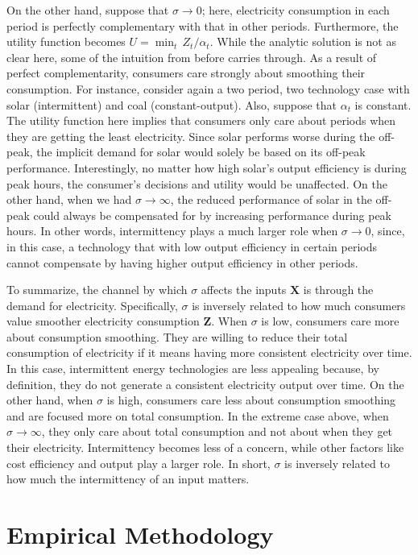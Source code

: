 \documentclass[11pt,a4paper,leqno]{extarticle}
\begin{document}
	On the other hand, suppose that $\sigma \to 0$; here, electricity consumption in each period is perfectly complementary with that in other periods. Furthermore, the utility function becomes $U = \min_t \, Z_t/\alpha_t$. While the analytic solution is not as clear here, some of the intuition from before carries through. As a result of perfect complementarity, consumers care strongly about smoothing their consumption. For instance, consider again a two period, two technology case with solar (intermittent) and coal (constant-output). Also, suppose that $\alpha_t$ is constant. The utility function here implies that consumers only care about periods when they are getting the least electricity. Since solar performs worse during the off-peak, the implicit demand for solar would solely be based on its off-peak performance. Interestingly, no matter how high solar's output efficiency is during peak hours, the consumer's decisions and utility would be unaffected. On the other hand, when we had $\sigma \to \infty$, the reduced performance of solar in the off-peak could always be compensated for by increasing performance during peak hours. In other words, intermittency plays a much larger role when $\sigma \to 0$, since, in this case, a technology that with low output efficiency in certain periods cannot compensate by having higher output efficiency in other periods. 
	
	To summarize, the channel by which $\sigma$ affects the inputs $\mathbf{X}$ is through the demand for electricity. Specifically, $\sigma$ is inversely related to how much consumers value smoother electricity consumption $\mathbf{Z}$. When $\sigma$ is low, consumers care more about consumption smoothing. They are willing to reduce their total consumption of electricity if it means having more consistent electricity over time. In this case, intermittent energy technologies are less appealing because, by definition, they do not generate a consistent electricity output over time. On the other hand, when $\sigma$ is high, consumers care less about consumption smoothing and are focused more on total consumption. In the extreme case above, when $\sigma \to \infty$, they only care about total consumption and not about when they get their electricity. Intermittency becomes less of a concern, while other factors like cost efficiency and output play a larger role. In short, $\sigma$ is inversely related to how much the intermittency of an input matters. 
	
	
	\section{Empirical Methodology}
	\label{sec:methodology}
	
\end{document}
